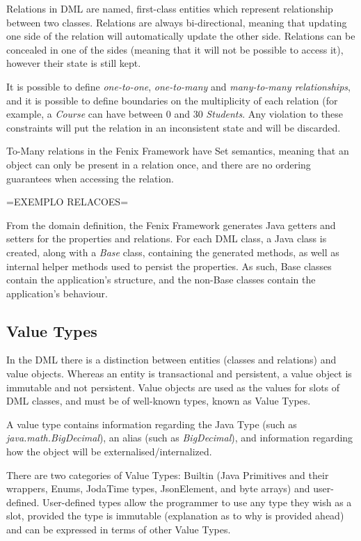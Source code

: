 Relations in DML are named, first-class entities which represent
relationship between two classes. Relations are always bi-directional,
meaning that updating one side of the relation will automatically
update the other side. Relations can be concealed in one of the sides
(meaning that it will not be possible to access it), however their
state is still kept.

It is possible to define {\it one-to-one}, {\it one-to-many} and {\it
  many-to-many relationships}, and it is possible to define boundaries
on the multiplicity of each relation (for example, a {\it Course} can
have between 0 and 30 {\it Students}. Any violation to these
constraints will put the relation in an inconsistent state and will be
discarded. 

To-Many relations in the Fenix Framework have Set semantics, meaning
that an object can only be present in a relation once, and there are
no ordering guarantees when accessing the relation.

=EXEMPLO RELACOES=

From the domain definition, the Fenix Framework generates Java getters
and setters for the properties and relations. For each DML class, a
Java class is created, along with a {\it Base} class, containing the
generated methods, as well as internal helper methods used to persist
the properties. As such, Base classes contain the application's
structure, and the non-Base classes contain the application's
behaviour. 

\subsection{Value Types}

In the DML there is a distinction between entities (classes and
relations) and value objects. Whereas an entity is transactional and
persistent, a value object is immutable and not persistent. Value
objects are used as the values for slots of DML classes, and must be
of well-known types, known as Value Types.

A value type contains information regarding the Java Type (such as
{\it java.math.BigDecimal}), an alias (such as {\it BigDecimal}), and information
regarding how the object will be externalised/internalized. 

There are two categories of Value Types: Builtin (Java Primitives and
their wrappers, Enums, JodaTime types, JsonElement, and byte arrays)
and user-defined. User-defined types allow the programmer to use any
type they wish as a slot, provided the type is immutable (explanation
as to why is provided ahead) and can be expressed in terms of other
Value Types.

